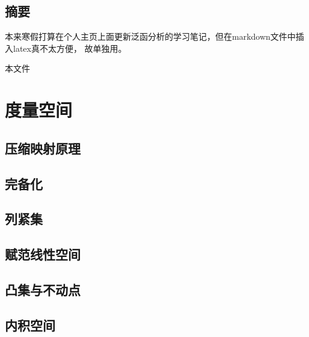 \documentclass[12pt,a4paper]{article}
\begin{document}
\begin{center}
\section*{摘要}
\end{center}

本来寒假打算在个人主页上面更新泛函分析的学习笔记，但在markdown文件中插入latex真不太方便，
故单独用。

本文件

{\centering\tableofcontents}

\newpage
\section{度量空间}
\subsection{压缩映射原理}
\subsection{完备化}
\subsection{列紧集}
\subsection{赋范线性空间}
\subsection{凸集与不动点}
\subsection{内积空间}
\end{document}
